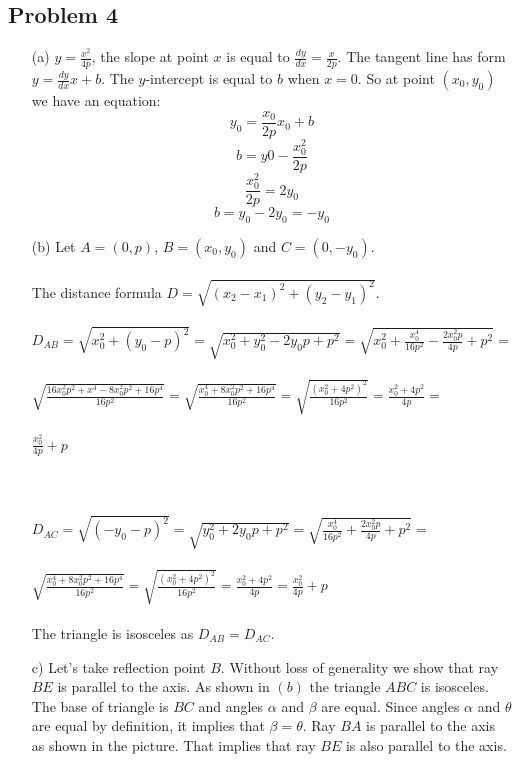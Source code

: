 \documentclass{article}
\begin{document}
\subsection{Problem 4}
\begin{itemize}
 \item[(a)] $y = \frac{x^2}{4p}$, the slope at point $x$ is equal to $\frac{dy}{dx} = \frac{x}{2p}$.
 The tangent line has form $y = \frac{dy}{dx}x + b$. The $y$-intercept is equal to $b$ when $x = 0$. So at point $(x_0, y_0)$ we have an equation:
 \[ y_0 = \frac{x_0}{2p}x_0 + b \]
 \[ b = y0 - \frac{x_0^2}{2p} \]
 \[ \frac{x_0^2}{2p} = 2y_0 \]
 \[ b = y_0 - 2y_0 = -y_0 \]

\item[(b)] Let $A = (0,p)$, $B = (x_0, y_0)$ and $C = (0, -y_0)$.\\
\\
The distance formula $D = \sqrt{(x_2 - x_1)^2 + (y_2 - y_1)^2}$. 
\\ \\
$D_{AB} = \sqrt{x_0^2 + (y_0-p)^2} = \sqrt{x_0^2 + y_0^2 - 2y_0p + p^2} = \sqrt{x_0^2+\frac{x_0^4}{16p^2}-\frac{2x_0^2p}{4p}+p^2} =$ \\ \\ $\sqrt{\frac{16x_0^2p^2+x^4-8x_0^2p^2+16p^4}{16p^2}} = \sqrt{\frac{x_0^4+8x_0^2p^2+16p^4}{16p^2}} = \sqrt{\frac{(x_0^2+4p^2)^2} {16p^2}}=\frac{x_0^2+4p^2}{4p} = $ \\ \\ $\frac{x_0^2}{4p}+p$ \\ \\ \\ \\
$D_{AC} = \sqrt{(-y_0-p)^2} = \sqrt{y_0^2 + 2y_0p + p^2} = \sqrt{\frac{x_0^4}{16p^2} + \frac{2x_0^2p}{4p} + p^2} = $
\\ \\
$\sqrt{\frac{x_0^4+8x_0^2p^2+16p^4}{16p^2}} = \sqrt{\frac{(x_0^2+4p^2)^2}{16p^2}} = \frac{x_0^2+4p^2}{4p} = \frac{x_0^2}{4p} + p$ \\ \\

The triangle is isosceles as $D_{AB} = D_{AC}$.
\newpage
\item[c)]
Let's take reflection point $B$. Without loss of generality we show that ray $BE$ is parallel to the axis. As shown in $(b)$ the triangle $ABC$ is isosceles. The base of triangle is $BC$ and angles $\alpha$ and $\beta$ are equal. Since angles $\alpha$ and $\theta$ are equal by definition, it implies that $\beta = \theta$. Ray $BA$ is parallel to the axis as shown in the picture. That implies that ray $BE$ is also parallel to the axis. 
\begin{figure}
    \centering
    
    \label{fig:enter-label}
\end{figure}
\end{itemize}
\end{document}
